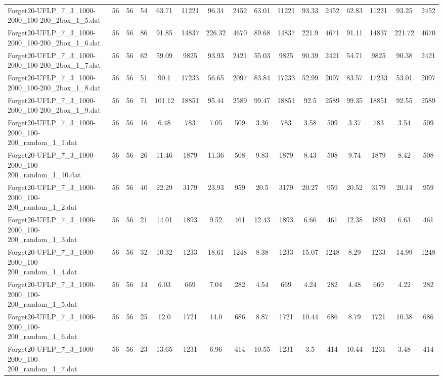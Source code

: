 \begin{sidewaystable}[!ht]
{\begin{tabular}{lccccccccccccccc}
Forget20-UFLP\_7\_3\_1000-2000\_100-200\_2box\_1\_5.dat & 56 & 56 & 54 & 63.71 & 11221 & 96.34 & 2452 & 63.01 & 11221 & 93.33 & 2452 &  \textcolor{blue2}{62.83} & 11221 & 93.25 & 2452 \\
Forget20-UFLP\_7\_3\_1000-2000\_100-200\_2box\_1\_6.dat & 56 & 56 & 86 & 91.85 & 14837 & 226.32 & 4670 &  \textcolor{blue2}{89.68} & 14837 & 221.9 & 4671 & 91.11 & 14837 & 221.72 & 4670 \\
Forget20-UFLP\_7\_3\_1000-2000\_100-200\_2box\_1\_7.dat & 56 & 56 & 62 & 59.09 & 9825 & 93.93 & 2421 & 55.03 & 9825 & 90.39 & 2421 &  \textcolor{blue2}{54.71} & 9825 & 90.38 & 2421 \\
Forget20-UFLP\_7\_3\_1000-2000\_100-200\_2box\_1\_8.dat & 56 & 56 & 51 & 90.1 & 17233 & 56.65 & 2097 & 83.84 & 17233 & 52.99 & 2097 & 83.57 & 17233 & 53.01 & 2097 \\
Forget20-UFLP\_7\_3\_1000-2000\_100-200\_2box\_1\_9.dat & 56 & 56 & 71 & 101.12 & 18851 & 95.44 & 2589 & 99.47 & 18851 & 92.5 & 2589 & 99.35 & 18851 & 92.55 & 2589 \\
Forget20-UFLP\_7\_3\_1000-2000\_100-200\_random\_1\_1.dat & 56 & 56 & 16 & 6.48 & 783 & 7.05 & 509 &  \textcolor{blue2}{3.36} & 783 & 3.58 & 509 & 3.37 & 783 & 3.54 & 509 \\
Forget20-UFLP\_7\_3\_1000-2000\_100-200\_random\_1\_10.dat & 56 & 56 & 26 & 11.46 & 1879 & 11.36 & 508 & 9.83 & 1879 & 8.43 & 508 & 9.74 & 1879 & 8.42 & 508 \\
Forget20-UFLP\_7\_3\_1000-2000\_100-200\_random\_1\_2.dat & 56 & 56 & 40 & 22.29 & 3179 & 23.93 & 959 & 20.5 & 3179 & 20.27 & 959 & 20.52 & 3179 & 20.14 & 959 \\
Forget20-UFLP\_7\_3\_1000-2000\_100-200\_random\_1\_3.dat & 56 & 56 & 21 & 14.01 & 1893 & 9.52 & 461 & 12.43 & 1893 & 6.66 & 461 & 12.38 & 1893 & 6.63 & 461 \\
Forget20-UFLP\_7\_3\_1000-2000\_100-200\_random\_1\_4.dat & 56 & 56 & 32 & 10.32 & 1233 & 18.61 & 1248 & 8.38 & 1233 & 15.07 & 1248 & 8.29 & 1233 & 14.99 & 1248 \\
Forget20-UFLP\_7\_3\_1000-2000\_100-200\_random\_1\_5.dat & 56 & 56 & 14 & 6.03 & 669 & 7.04 & 282 & 4.54 & 669 & 4.24 & 282 & 4.48 & 669 & 4.22 & 282 \\
Forget20-UFLP\_7\_3\_1000-2000\_100-200\_random\_1\_6.dat & 56 & 56 & 25 & 12.0 & 1721 & 14.0 & 686 & 8.87 & 1721 & 10.44 & 686 & 8.79 & 1721 & 10.38 & 686 \\
Forget20-UFLP\_7\_3\_1000-2000\_100-200\_random\_1\_7.dat & 56 & 56 & 23 & 13.65 & 1231 & 6.96 & 414 & 10.55 & 1231 & 3.5 & 414 & 10.44 & 1231 & 3.48 & 414 \\

\end{tabular}}
\end{sidewaystable}
